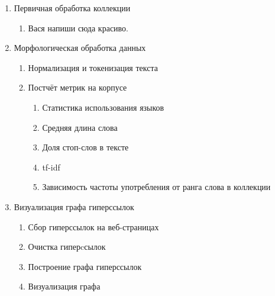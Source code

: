 \documentclass[twocolumn]{article}
\begin{document}
\begin{enumerate}
	\item Первичная обработка коллекции
	\begin{enumerate}
		\item {\color{red} Вася напиши сюда красиво.}
	\end{enumerate}
	\item Морфологическая обработка данных
	\begin{enumerate}
		\item Нормализация и токенизация текста 
		\item Постчёт метрик на корпусе
		\begin{enumerate}
			\item Статистика использования языков
			\item Средняя длина слова
			\item Доля стоп-слов в тексте
			\item tf-idf
			\item Зависимость частоты употребления от ранга слова в коллекции 
		\end{enumerate}
	\end{enumerate}
	\item Визуализация графа гиперссылок
	\begin{enumerate}
		\item Сбор гиперссылок на веб-страницах
		\item Очистка гиперcсылок
		\item Построение графа гиперссылок
		\item Визуализация графа
	\end{enumerate}
\end{enumerate}






\end{document}
